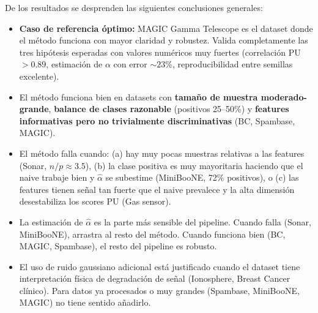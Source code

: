 \documentclass[a4paper,11pt]{article}
\begin{document}
\medskip
De los resultados se desprenden las siguientes conclusiones generales:

\begin{itemize}
    \item \textbf{Caso de referencia óptimo:} MAGIC Gamma Telescope es el dataset donde el método funciona con mayor claridad y robustez. Valida completamente las tres hipótesis esperadas con valores numéricos muy fuertes (correlación PU $>0.89$, estimación de $\alpha$ con error $\sim 23\%$, reproducibilidad entre semillas excelente).
    
    \item El método funciona bien en datasets con \textbf{tamaño de muestra moderado-grande}, \textbf{balance de clases razonable} (positivos 25--50\%) y \textbf{features informativas pero no trivialmente discriminativas} (BC, Spambase, MAGIC).
    
    \item El método falla cuando: (a) hay muy pocas muestras relativas a las features (Sonar, $n/p \approx 3.5$), (b) la clase positiva es muy mayoritaria haciendo que el naive trabaje bien y $\hat{\alpha}$ se subestime (MiniBooNE, 72\% positivos), o (c) las features tienen señal tan fuerte que el naive prevalece y la alta dimensión desestabiliza los scores PU (Gas sensor).
    
    \item La estimación de $\hat{\alpha}$ es la parte más sensible del pipeline. Cuando falla (Sonar, MiniBooNE), arrastra al resto del método. Cuando funciona bien (BC, MAGIC, Spambase), el resto del pipeline es robusto.
    
    \item El uso de ruido gaussiano adicional está justificado cuando el dataset tiene interpretación física de degradación de señal (Ionosphere, Breast Cancer clínico). Para datos ya procesados o muy grandes (Spambase, MiniBooNE, MAGIC) no tiene sentido añadirlo.
\end{itemize}
\end{document}
